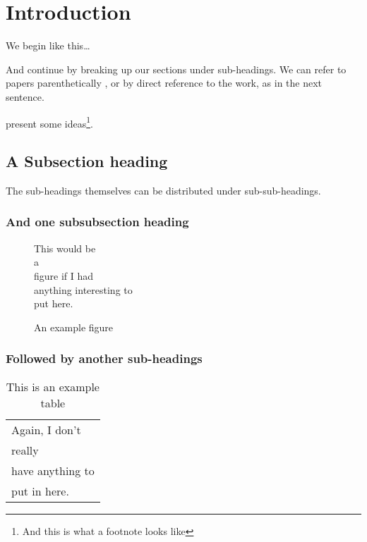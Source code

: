 

\section{Introduction}

We begin like this\ldots

And continue by breaking up our sections under sub-headings. We can refer
to papers parenthetically \citep{AB86}, or by direct reference to the work,
as in the next sentence.

\citet{AD94} present some ideas\footnote{And this is what a footnote looks
  like}.

\subsection{A Subsection heading}
The sub-headings themselves can be distributed under sub-sub-headings.

\subsubsection{And one subsubsection heading}

\begin{figure}[!ht]
  \begin{center}
    This would be
    \\
    a
    \\
    figure if I had
    \\
    anything interesting to
    \\
    put here.
  \end{center}
  \caption{An example figure}
  \label{figex}
\end{figure}

\subsubsection{Followed by another sub-headings}

\begin{table}[!ht]
  \caption{This is an example table}
  \label{tabex}
  \begin{center}
    \begin{tabular}{|l|}
      \hline
      Again, I don't \\
      really\\
      \hline
      have anything to\\
      put in here.\\
      \hline
    \end{tabular}
  \end{center}
\end{table}
